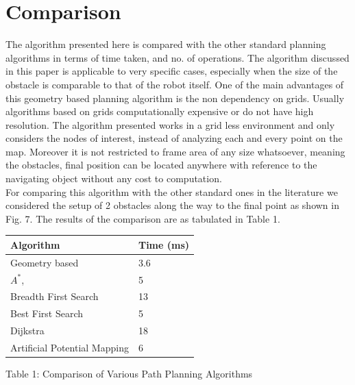 \documentclass[letterpaper, 10 pt, conference]{ieeeconf}  %
\begin{document}
\section{Comparison}
The algorithm presented here is compared with the other standard planning algorithms in terms of time taken, and no. of operations. The algorithm discussed in this paper is applicable to very specific cases, especially when the size of the obstacle is comparable to that of the robot itself. One of the main advantages of this geometry based planning algorithm is the non dependency on grids. Usually algorithms based on grids computationally expensive or do not have high resolution. The algorithm presented works in a grid less environment and only considers the nodes of interest, instead of analyzing each and every point on the map. Moreover it is not restricted to frame area of any size whatsoever, meaning the obstacles, final position can be located anywhere with reference to the navigating object without any cost to computation.\\
For comparing this algorithm with the other standard ones in the literature we considered the setup of 2 obstacles along the way to the final point as shown in Fig. 7. The results of the comparison are as tabulated in Table 1.\\ 
\begin{center}
    \begin{tabular}{| p{3cm} | l | }
    \hline
    \textbf{Algorithm} & \textbf{Time (ms)}  \\ \hline
    Geometry based & 3.6 \\ \hline
    $A^{*}$,  & 5 \\ \hline
    Breadth First Search & 13 \\
    \hline
    Best First Search & 5   \\ \hline
    Dijkstra & 18 \\ \hline
    Artificial Potential Mapping & 6 \\ \hline
    \end{tabular}
\end{center}
\begin{center}
\small{Table 1: Comparison of Various Path Planning Algorithms\\}
\end{center}
\end{document}
